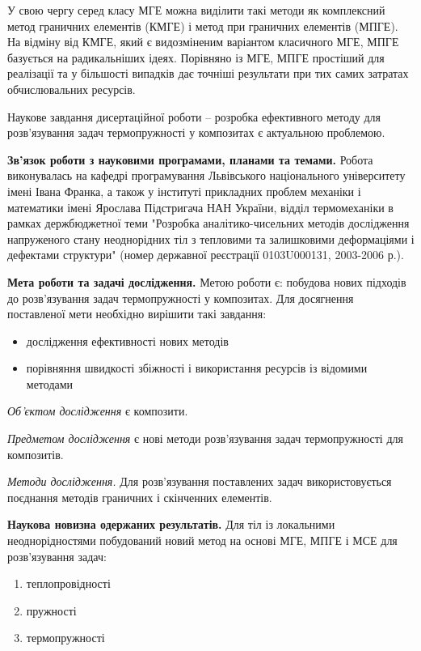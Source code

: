 У свою чергу серед класу МГЕ можна виділити такі методи як комплексний метод граничних елементів (КМГЕ) і метод при
граничних елементів (МПГЕ). На відміну від КМГЕ, який є видозміненим варіантом класичного МГЕ, МПГЕ базується на
радикальніших ідеях. Порівняно із МГЕ, МПГЕ простіший для реалізації та у більшості випадків дає точніші результати при
тих самих затратах обчислювальних ресурсів.

Наукове завдання дисертаційної роботи -- розробка ефективного методу для розв'язування задач термопружності у композитах
є актуальною проблемою.

\textbf{Зв'язок роботи з науковими програмами, планами та темами.} Робота виконувалась на кафедрі програмування
Львівського національного університету імені Івана Франка, а також у інституті прикладних проблем механіки і математики
імені Ярослава Підстригача НАН України, відділ термомеханіки в рамках держбюджетної теми "Розробка аналітико-чисельних
методів дослідження напруженого стану неоднорідних тіл з тепловими та залишковими деформаціями і дефектами структури" 
(номер державної реєстрації 0103U000131, 2003-2006 р.).

\textbf{Мета роботи та задачі дослідження.} Метою роботи є: побудова нових підходів до розв'язування задач
термопружності у композитах. Для досягнення поставленої мети необхідно вирішити такі завдання:
\begin{itemize}
\item
  дослідження ефективності нових методів
\item
  порівняння швидкості збіжності і використання ресурсів із відомими методами
\end{itemize}

\emph{Об'єктом дослідження} є композити.

\emph{Предметом дослідження} є нові методи розв'язування задач термопружності для композитів.

\emph{Методи дослідження.} Для розв'язування поставлених задач використовується поєднання методів граничних і скінченних
елементів.

\textbf{Наукова новизна одержаних результатів.} Для тіл із локальними неоднорідностями побудований новий метод на основі
МГЕ, МПГЕ і МСЕ для розв'язування задач:

\begin{enumerate}
\item
  теплопровідності
\item
  пружності
\item
  термопружності
\end{enumerate}

